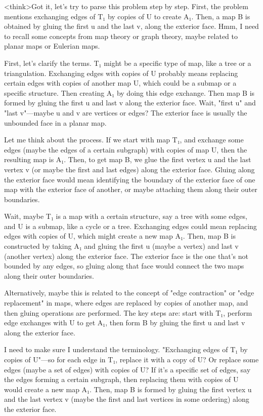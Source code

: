 <think>Got it, let's try to parse this problem step by step. First, the problem mentions exchanging edges of T₁ by copies of U to create A₁. Then, a map B is obtained by gluing the first u and the last v, along the exterior face. Hmm, I need to recall some concepts from map theory or graph theory, maybe related to planar maps or Eulerian maps. 

First, let's clarify the terms. T₁ might be a specific type of map, like a tree or a triangulation. Exchanging edges with copies of U probably means replacing certain edges with copies of another map U, which could be a submap or a specific structure. Then creating A₁ by doing this edge exchange. Then map B is formed by gluing the first u and last v along the exterior face. Wait, "first u" and "last v"—maybe u and v are vertices or edges? The exterior face is usually the unbounded face in a planar map.

Let me think about the process. If we start with map T₁, and exchange some edges (maybe the edges of a certain subgraph) with copies of map U, then the resulting map is A₁. Then, to get map B, we glue the first vertex u and the last vertex v (or maybe the first and last edges) along the exterior face. Gluing along the exterior face would mean identifying the boundary of the exterior face of one map with the exterior face of another, or maybe attaching them along their outer boundaries.

Wait, maybe T₁ is a map with a certain structure, say a tree with some edges, and U is a submap, like a cycle or a tree. Exchanging edges could mean replacing edges with copies of U, which might create a new map A₁. Then, map B is constructed by taking A₁ and gluing the first u (maybe a vertex) and last v (another vertex) along the exterior face. The exterior face is the one that's not bounded by any edges, so gluing along that face would connect the two maps along their outer boundaries.

Alternatively, maybe this is related to the concept of "edge contraction" or "edge replacement" in maps, where edges are replaced by copies of another map, and then gluing operations are performed. The key steps are: start with T₁, perform edge exchanges with U to get A₁, then form B by gluing the first u and last v along the exterior face. 

I need to make sure I understand the terminology. "Exchanging edges of T₁ by copies of U"—so for each edge in T₁, replace it with a copy of U? Or replace some edges (maybe a set of edges) with copies of U? If it's a specific set of edges, say the edges forming a certain subgraph, then replacing them with copies of U would create a new map A₁. Then, map B is formed by gluing the first vertex u and the last vertex v (maybe the first and last vertices in some ordering) along the exterior face. 

